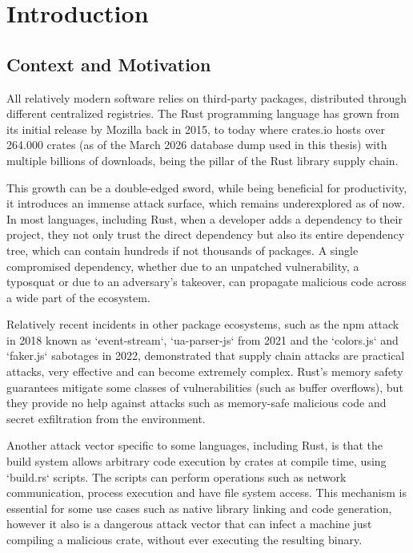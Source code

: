 
\chapter{Introduction}\label{cap:intro}

\section{Context and Motivation}\label{sect:context-motivation}

All relatively modern software relies on third-party packages, distributed through different centralized registries. The Rust programming language has grown from its initial release by Mozilla back in 2015, to today where crates.io hosts over 264.000 crates (as of the March 2026 database dump used in this thesis) with multiple billions of downloads, being the pillar of the Rust library supply chain.

This growth can be a double-edged sword, while being beneficial for productivity, it introduces an immense attack surface, which remains underexplored as of now. In most languages, including Rust, when a developer adds a dependency to their project, they not only trust the direct dependency but also its entire dependency tree, which can contain hundreds if not thousands of packages. A single compromised dependency, whether due to an unpatched vulnerability, a typosquat or due to an adversary's takeover, can propagate malicious code across a wide part of the ecosystem.

Relatively recent incidents in other package ecosystems, such as the npm attack in 2018 known as `event-stream`, `ua-parser-js` from 2021 and the `colors.js` and `faker.js` sabotages in 2022, demonstrated that supply chain attacks are practical attacks, very effective and can become extremely complex. Rust's memory safety guarantees mitigate some classes of vulnerabilities (such as buffer overflows), but they provide no help against attacks such as memory-safe malicious code and secret exfiltration from the environment.

Another attack vector specific to some languages, including Rust, is that the build system allows arbitrary code execution by crates at compile time, using `build.rs` scripts. The scripts can perform operations such as network communication, process execution and have file system access. This mechanism is essential for some use cases such as native library linking and code generation, however it also is a dangerous attack vector that can infect a machine just compiling a malicious crate, without ever executing the resulting binary.

